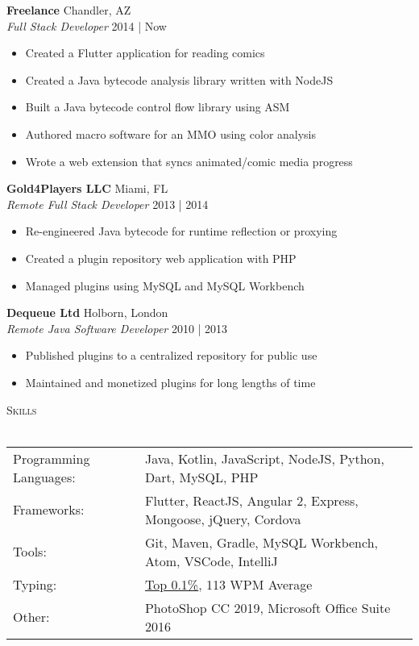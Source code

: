 \documentclass[a4paper]{article}
\newcommand{\lineunder} {
    \vspace*{-8pt} \\
    \hspace*{-18pt} \hrulefill \\
}
\newcommand{\header} [1] {
    {\hspace*{-18pt}\vspace*{6pt} \textsc{#1}}
    \vspace*{-6pt} \lineunder
}
\begin{document}
\textbf{Freelance} \hfill Chandler, AZ\\
\textit{Full Stack Developer} \hfill 2014 | Now\\
\vspace{-1mm}
\begin{itemize} \itemsep 1pt
	\item Created a Flutter application for reading comics
	\item Created a Java bytecode analysis library written with NodeJS
	\item Built a Java bytecode control flow library using ASM
	\item Authored macro software for an MMO using color analysis
	\item Wrote a web extension that syncs animated/comic media progress
\end{itemize}
\textbf{Gold4Players LLC} \hfill Miami, FL\\
\textit{Remote Full Stack Developer} \hfill 2013 | 2014\\
\vspace{-1mm}
\begin{itemize} \itemsep 1pt
	\item Re-engineered Java bytecode for runtime reflection or proxying
	\item Created a plugin repository web application with PHP
	\item Managed plugins using MySQL and MySQL Workbench
\end{itemize}
\textbf{Dequeue Ltd} \hfill Holborn, London\\
\textit{Remote Java Software Developer} \hfill 2010 | 2013\\
\vspace{-1mm}
\begin{itemize} \itemsep 1pt
	\item Published plugins to a centralized repository for public use
	\item Maintained and monetized plugins for long lengths of time
\end{itemize}

\header{Skills}
\vspace{2mm}
\begin{tabular}{ l l }
	Programming Languages: & Java, Kotlin, JavaScript, NodeJS, Python, Dart, MySQL, PHP    \\
	Frameworks:            & Flutter, ReactJS, Angular 2, Express, Mongoose, jQuery, Cordova
	\vspace{0.5mm}\\
	Tools:                 & Git, Maven, Gradle, MySQL Workbench, Atom, VSCode, IntelliJ
	\vspace{0.5mm}\\
	Typing:                & \href{https://data.typeracer.com/misc/badge?user=tsedlar}{\ul{Top 0.1\%}}, 113 WPM Average
	\vspace{0.5mm}\\
	Other:                 & PhotoShop CC 2019, Microsoft Office Suite 2016  \\
\end{tabular}
\vspace{2mm}
\end{document}
